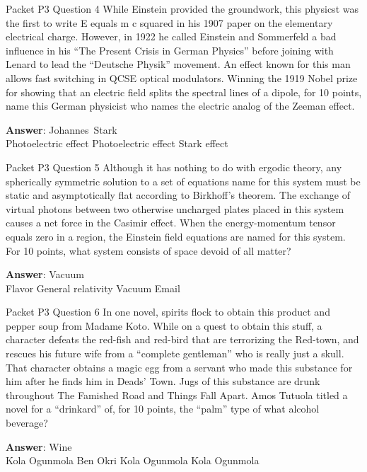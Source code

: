 \begin{frame}{Packet P3 Question 4}
While Einstein provided the groundwork, this physicst was the first to write E equals m c squared in his 1907 paper on the elementary electrical charge.  However, in 1922 he called Einstein and Sommerfeld a bad influence in his ``The Present Crisis in German Physics'' before joining with Lenard to lead     the ``Deutsche Physik'' movement.  An effect known for this man allows fast switching in QCSE optical modulators.  Winning the 1919 Nobel prize for showing that an electric field splits   the spectral lines of a dipole, for   10 points, name this German physicist who names the electric analog of the Zeeman   effect.

\textbf{Answer}: Johannes\ Stark\\
 Photoelectric effect
 Photoelectric effect
 Stark effect
\end{frame}

\begin{frame}{Packet P3 Question 5}
Although it has nothing   to do with ergodic theory, any spherically symmetric solution to a set of equations name for this system must be static and asymptotically flat according to Birkhoff's theorem. The exchange of virtual photons between two otherwise uncharged plates placed in this system causes a net force in the Casimir effect. When the energy-momentum tensor equals zero in a region, the Einstein field equations   are named for this system. For 10 points, what system consists of space devoid of all matter?    

\textbf{Answer}: Vacuum\\
 Flavor
 General relativity
 Vacuum
 Email
\end{frame}

\begin{frame}{Packet P3 Question 6}
In one novel, spirits flock to obtain this product and pepper soup from Madame Koto. While on a quest to obtain this stuff, a character defeats   the red-fish and red-bird that are terrorizing the Red-town, and rescues his future wife from a “complete gentleman” who is really just a skull. That character obtains a magic egg from a servant who made this substance   for him after he finds him in Deads’ Town. Jugs of this substance are drunk throughout The Famished Road and Things Fall   Apart. Amos Tutuola titled a novel for a “drinkard” of, for 10 points, the “palm” type of what alcohol beverage?    

\textbf{Answer}: Wine\\
 Kola Ogunmola
 Ben Okri
 Kola Ogunmola
 Kola Ogunmola
\end{frame}

